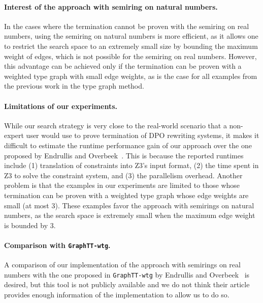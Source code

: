  \paragraph{Interest of the approach with semiring on natural numbers.}
 In the cases where the termination cannot be proven with the semiring on real numbers,
 using the semiring on natural numbers is more efficient, as it allows one to restrict the search space to an extremely small size by bounding the maximum weight of edges, which is not possible for the semiring on real numbers. However, this advantage can be achieved only if the termination can be proven with a weighted type graph with small edge weights, as is the case for all examples from the previous work in the type graph method.
\paragraph{Limitations of our experiments.} 
While our search strategy is very close to the real-world scenario that a non-expert user would use to prove termination of DPO rewriting systems, 
it makes it difficult to estimate the runtime performance gain of our approach over the one proposed by Endrullis and Overbeek~\cite{endrullis2024generalized_arxiv_v2}.  
This is because the reported runtimes include (1) translation of constraints into Z3's input format, (2) the time spent in Z3 to solve the constraint system, and (3) the parallelism overhead. 
Another problem is that the examples in our experiments are limited to those whose termination can be proven with a weighted type graph whose edge weights are small (at most 3). These examples favor the approach with semirings on natural numbers, as the search space is extremely small when the maximum edge weight is bounded by 3.
\paragraph{Comparison with \texttt{GraphTT-wtg}.}
A comparison of our implementation of the approach with semirings on real numbers with the one proposed in \texttt{GraphTT-wtg} by Endrullis and Overbeek~\cite{endrullis2024generalized_arxiv_v3} is desired, but this tool is not publicly available and we do not think their article provides enough information of the implementation to allow us to do so.
